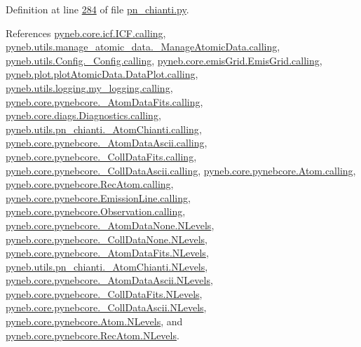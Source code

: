 Definition at line \hyperlink{pn__chianti_8py_source_l00284}{284} of file \hyperlink{pn__chianti_8py_source}{pn\+\_\+chianti.\+py}.



References \hyperlink{icf_8py_source_l00016}{pyneb.\+core.\+icf.\+I\+C\+F.\+calling}, \hyperlink{manage__atomic__data_8py_source_l00018}{pyneb.\+utils.\+manage\+\_\+atomic\+\_\+data.\+\_\+\+Manage\+Atomic\+Data.\+calling}, \hyperlink{_config_8py_source_l00032}{pyneb.\+utils.\+Config.\+\_\+\+Config.\+calling}, \hyperlink{emis_grid_8py_source_l00041}{pyneb.\+core.\+emis\+Grid.\+Emis\+Grid.\+calling}, \hyperlink{plot_atomic_data_8py_source_l00042}{pyneb.\+plot.\+plot\+Atomic\+Data.\+Data\+Plot.\+calling}, \hyperlink{logging_8py_source_l00044}{pyneb.\+utils.\+logging.\+my\+\_\+logging.\+calling}, \hyperlink{pynebcore_8py_source_l00090}{pyneb.\+core.\+pynebcore.\+\_\+\+Atom\+Data\+Fits.\+calling}, \hyperlink{diags_8py_source_l00169}{pyneb.\+core.\+diags.\+Diagnostics.\+calling}, \hyperlink{pn__chianti_8py_source_l00223}{pyneb.\+utils.\+pn\+\_\+chianti.\+\_\+\+Atom\+Chianti.\+calling}, \hyperlink{pynebcore_8py_source_l00311}{pyneb.\+core.\+pynebcore.\+\_\+\+Atom\+Data\+Ascii.\+calling}, \hyperlink{pynebcore_8py_source_l00568}{pyneb.\+core.\+pynebcore.\+\_\+\+Coll\+Data\+Fits.\+calling}, \hyperlink{pynebcore_8py_source_l00918}{pyneb.\+core.\+pynebcore.\+\_\+\+Coll\+Data\+Ascii.\+calling}, \hyperlink{pynebcore_8py_source_l01175}{pyneb.\+core.\+pynebcore.\+Atom.\+calling}, \hyperlink{pynebcore_8py_source_l02572}{pyneb.\+core.\+pynebcore.\+Rec\+Atom.\+calling}, \hyperlink{pynebcore_8py_source_l03263}{pyneb.\+core.\+pynebcore.\+Emission\+Line.\+calling}, \hyperlink{pynebcore_8py_source_l03419}{pyneb.\+core.\+pynebcore.\+Observation.\+calling}, \hyperlink{pynebcore_8py_source_l00062}{pyneb.\+core.\+pynebcore.\+\_\+\+Atom\+Data\+None.\+N\+Levels}, \hyperlink{pynebcore_8py_source_l00075}{pyneb.\+core.\+pynebcore.\+\_\+\+Coll\+Data\+None.\+N\+Levels}, \hyperlink{pynebcore_8py_source_l00155}{pyneb.\+core.\+pynebcore.\+\_\+\+Atom\+Data\+Fits.\+N\+Levels}, \hyperlink{pn__chianti_8py_source_l00268}{pyneb.\+utils.\+pn\+\_\+chianti.\+\_\+\+Atom\+Chianti.\+N\+Levels}, \hyperlink{pynebcore_8py_source_l00404}{pyneb.\+core.\+pynebcore.\+\_\+\+Atom\+Data\+Ascii.\+N\+Levels}, \hyperlink{pynebcore_8py_source_l00637}{pyneb.\+core.\+pynebcore.\+\_\+\+Coll\+Data\+Fits.\+N\+Levels}, \hyperlink{pynebcore_8py_source_l00984}{pyneb.\+core.\+pynebcore.\+\_\+\+Coll\+Data\+Ascii.\+N\+Levels}, \hyperlink{pynebcore_8py_source_l01260}{pyneb.\+core.\+pynebcore.\+Atom.\+N\+Levels}, and \hyperlink{pynebcore_8py_source_l02585}{pyneb.\+core.\+pynebcore.\+Rec\+Atom.\+N\+Levels}.




